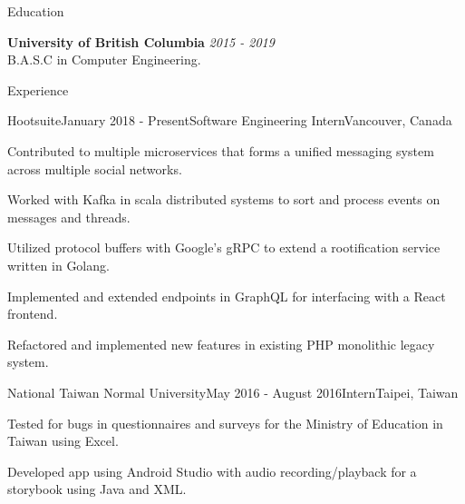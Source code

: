 \documentclass{resume} %
\begin{document}

\begin{rSection}{Education}

{\bf University of British Columbia} \hfill {\em 2015 - 2019} \\ 
B.A.S.C in Computer Engineering.

\end{rSection}
\begin{rSection}{Experience}

\begin{rSubsection}{Hootsuite}{January 2018 - Present}{Software Engineering Intern}{Vancouver, Canada}
\item Contributed to multiple microservices that forms a unified messaging system across multiple social networks.
\item Worked with Kafka in scala distributed systems to sort and process events on messages and threads.
\item Utilized protocol buffers with Google's gRPC to extend a rootification service written in Golang.
\item Implemented and extended endpoints in GraphQL for interfacing with a React frontend.
\item Refactored and implemented new features in existing PHP monolithic legacy system.  
\end{rSubsection}
\begin{rSubsection}{National Taiwan Normal University}{May 2016 - August 2016}{Intern}{Taipei, Taiwan}
\item Tested for bugs in questionnaires and surveys for the Ministry of Education in Taiwan using Excel.
\item Developed app using Android Studio with audio recording/playback for a storybook using Java and XML.
\end{rSubsection}

\end{rSection}


\end{document}
